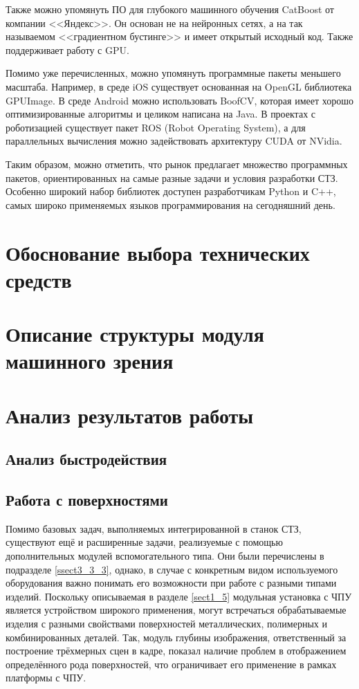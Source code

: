 Также можно упомянуть ПО для глубокого машинного обучения CatBoost от компании <<Яндекс>>. Он основан не на нейронных сетях, а на так называемом <<градиентном бустинге>> и имеет открытый исходный код. Также поддерживает работу с GPU.

Помимо уже перечисленных, можно упомянуть программные пакеты меньшего масштаба. Например, в среде iOS существует основанная на OpenGL библиотека GPUImage. В среде Android можно использовать BoofCV, которая имеет хорошо оптимизированные алгоритмы и целиком написана на Java. В проектах с роботизацией существует пакет ROS (Robot Operating System), а для параллельных вычисления можно задействовать архитектуру CUDA от NVidia.

Таким образом, можно отметить, что рынок предлагает множество программных пакетов, ориентированных на самые разные задачи и условия разработки СТЗ. Особенно широкий набор библиотек доступен разработчикам Python и C++, самых широко применяемых языков программирования на сегодняшний день.

\section{Обоснование выбора технических средств} \label{sect4_2}

\section{Описание структуры модуля машинного зрения} \label{sect4_3}

\section{Анализ результатов работы} \label{sect4_4}

\subsection{Анализ быстродействия} \label{sect4_4_1}

\subsection{Работа с поверхностями} \label{sect4_4_2}

Помимо базовых задач, выполняемых интегрированной в станок СТЗ, существуют ещё и расширенные задачи, реализуемые с помощью дополнительных модулей вспомогательного типа. Они были перечислены в подразделе \cref{ssect3_3_3}, однако, в случае с конкретным видом используемого оборудования важно понимать его возможности при работе с разными типами изделий. Поскольку описываемая в разделе \cref{sect1_5} модульная установка с ЧПУ является устройством широкого применения, могут встречаться обрабатываемые изделия с разными свойствами поверхностей металлических, полимерных и комбинированных деталей. Так, модуль глубины изображения, ответственный за построение трёхмерных сцен в кадре, показал наличие проблем в отображением определённого рода поверхностей, что ограничивает его применение в рамках платформы с ЧПУ.

